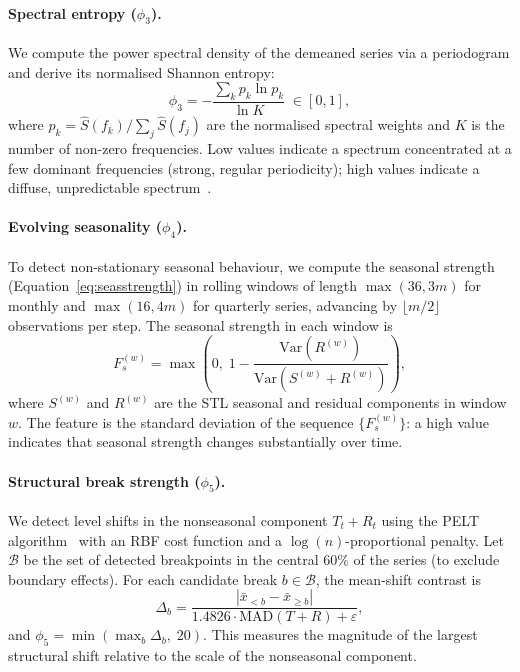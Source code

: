 \documentclass[pdflatex,sn-mathphys-num]{sn-jnl}
\theoremstyle{thmstyleone}
\theoremstyle{thmstyletwo}
\theoremstyle{thmstylethree}
\begin{document}
\paragraph{Spectral entropy ($\phi_3$).}
We compute the power spectral density of the demeaned series via a periodogram
and derive its normalised Shannon entropy:
\begin{equation}
  \phi_3 = -\frac{\displaystyle\sum_{k} p_k \ln p_k}{\ln K}
          \;\in [0, 1],
  \label{eq:phi3}
\end{equation}
where $p_k = \hat{S}(f_k) / \sum_j \hat{S}(f_j)$ are the normalised spectral
weights and $K$ is the number of non-zero frequencies.
Low values indicate a spectrum concentrated at a few dominant frequencies
(strong, regular periodicity); high values indicate a diffuse, unpredictable
spectrum~\cite{spectral_entropy_ref}.

\paragraph{Evolving seasonality ($\phi_4$).}
To detect non-stationary seasonal behaviour, we compute the seasonal strength
(Equation~\ref{eq:seasstrength}) in rolling windows of length
$\max(36, 3m)$ for monthly and $\max(16, 4m)$ for quarterly series,
advancing by $\lfloor m/2 \rfloor$ observations per step.
The seasonal strength in each window is
\begin{equation}
  F_s^{(w)} = \max\!\left(0,\; 1 - \frac{\mathrm{Var}(R^{(w)})}
                                         {\mathrm{Var}(S^{(w)} + R^{(w)})}\right),
  \label{eq:seasstrength}
\end{equation}
where $S^{(w)}$ and $R^{(w)}$ are the STL seasonal and residual components in
window $w$.
The feature is the standard deviation of the sequence $\{F_s^{(w)}\}$:
a high value indicates that seasonal strength changes substantially over time.

\paragraph{Structural break strength ($\phi_5$).}
We detect level shifts in the nonseasonal component $T_t + R_t$ using the
PELT algorithm~\cite{killick2012} with an RBF cost function and a
$\log(n)$-proportional penalty.
Let $\mathcal{B}$ be the set of detected breakpoints in the central 60\% of the
series (to exclude boundary effects).
For each candidate break $b \in \mathcal{B}$, the mean-shift contrast is
\begin{equation}
  \Delta_b = \frac{|\bar{x}_{<b} - \bar{x}_{\geq b}|}
                  {1.4826 \cdot \mathrm{MAD}(T + R) + \varepsilon},
  \label{eq:breakcontrast}
\end{equation}
and $\phi_5 = \min(\max_b \Delta_b,\; 20)$.
This measures the magnitude of the largest structural shift relative to
the scale of the nonseasonal component.
\end{document}
